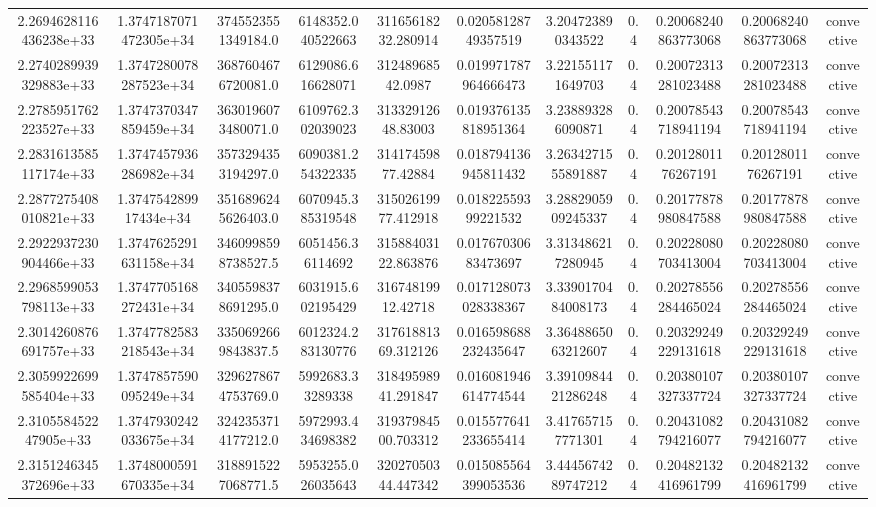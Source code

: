 \begin{table}
\begin{tabular}{ccccccccccc}
2.2694628116436238e+33 & 1.3747187071472305e+34 & 3745523551349184.0 & 6148352.040522663 & 31165618232.280914 & 0.02058128749357519 & 3.204723890343522 & 0.4 & 0.20068240863773068 & 0.20068240863773068 & convective \\
2.2740289939329883e+33 & 1.3747280078287523e+34 & 3687604676720081.0 & 6129086.616628071 & 31248968542.0987 & 0.019971787964666473 & 3.221551171649703 & 0.4 & 0.20072313281023488 & 0.20072313281023488 & convective \\
2.2785951762223527e+33 & 1.3747370347859459e+34 & 3630196073480071.0 & 6109762.302039023 & 31332912648.83003 & 0.019376135818951364 & 3.238893286090871 & 0.4 & 0.20078543718941194 & 0.20078543718941194 & convective \\
2.2831613585117174e+33 & 1.3747457936286982e+34 & 3573294353194297.0 & 6090381.254322335 & 31417459877.42884 & 0.018794136945811432 & 3.2634271555891887 & 0.4 & 0.2012801176267191 & 0.2012801176267191 & convective \\
2.2877275408010821e+33 & 1.374754289917434e+34 & 3516896245626403.0 & 6070945.385319548 & 31502619977.412918 & 0.01822559399221532 & 3.2882905909245337 & 0.4 & 0.20177878980847588 & 0.20177878980847588 & convective \\
2.2922937230904466e+33 & 1.3747625291631158e+34 & 3460998598738527.5 & 6051456.36114692 & 31588403122.863876 & 0.01767030683473697 & 3.313486217280945 & 0.4 & 0.20228080703413004 & 0.20228080703413004 & convective \\
2.2968599053798113e+33 & 1.3747705168272431e+34 & 3405598378691295.0 & 6031915.602195429 & 31674819912.42718 & 0.017128073028338367 & 3.3390170484008173 & 0.4 & 0.20278556284465024 & 0.20278556284465024 & convective \\
2.3014260876691757e+33 & 1.3747782583218543e+34 & 3350692669843837.5 & 6012324.283130776 & 31761881369.312126 & 0.016598688232435647 & 3.3648865063212607 & 0.4 & 0.20329249229131618 & 0.20329249229131618 & convective \\
2.3059922699585404e+33 & 1.3747857590095249e+34 & 3296278674753769.0 & 5992683.33289338 & 31849598941.291847 & 0.016081946614774544 & 3.3910984421286248 & 0.4 & 0.20380107327337724 & 0.20380107327337724 & convective \\
2.310558452247905e+33 & 1.3747930242033675e+34 & 3242353714177212.0 & 5972993.434698382 & 31937984500.703312 & 0.015577641233655414 & 3.417657157771301 & 0.4 & 0.20431082794216077 & 0.20431082794216077 & convective \\
2.3151246345372696e+33 & 1.3748000591670335e+34 & 3188915227068771.5 & 5953255.026035643 & 32027050344.447342 & 0.015085564399053536 & 3.4445674289747212 & 0.4 & 0.20482132416961799 & 0.20482132416961799 & convective \\

\end{tabular}
\end{table}
